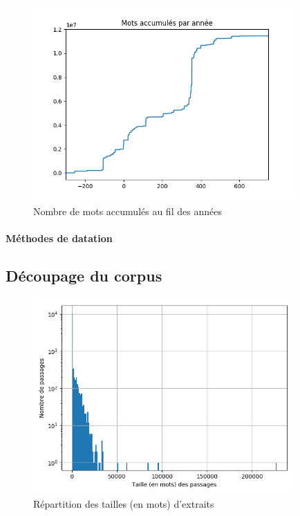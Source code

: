 \begin{figure}[h]
    \centering
    \includegraphics[width=10cm]{results/analysis/corpus_analysis/accumulated_tokens.png}
    \caption{Nombre de mots accumulés au fil des années}
    \label{accumulated_tokens_per_year}
\end{figure}


\paragraph{Méthodes de datation}

\subsection{Découpage du corpus}
\label{subsec:corpus_decoupage}

\begin{figure}[ht]
    \centering
    \includegraphics[width=10cm]{results/analysis/corpus_analysis/passage_size_distribution.png}
    \caption{Répartition des tailles (en mots) d'extraits}
    \label{passage_size_distribution}
\end{figure}


